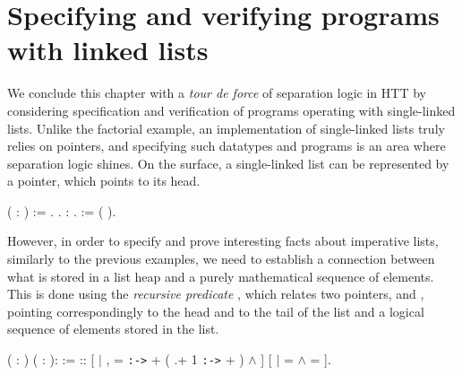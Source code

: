 \section{Specifying and verifying programs with linked lists}


We conclude this chapter with a \textit{tour de force} of separation logic in
HTT by considering specification and verification of programs
operating with single-linked lists. Unlike the factorial example, an
implementation of single-linked lists truly relies on pointers, and
specifying such datatypes and programs is an area where separation
logic shines.
On the surface, a single-linked list can be represented by a pointer,
which points to its head.
\begin{coqdoccode}
\coqdocemptyline
\coqdocnoindent
{}  ( : ) := .\coqdoceol
\coqdocemptyline
\coqdocnoindent
{} .\coqdoceol
\coqdocnoindent
{}  : .\coqdoceol
\coqdocnoindent
{}  := ( ).\coqdoceol
\coqdocemptyline
\end{coqdoccode}


However, in order to specify and prove interesting facts about
imperative lists, similarly to the previous examples, we need to
establish a connection between what is stored in a list heap and a
purely mathematical sequence of elements. This is done using the
\textit{recursive predicate} , which relates two pointers,  and ,
pointing correspondingly to the head and to the tail of the list and a
logical sequence  of elements stored in the list.
\begin{coqdoccode}
\coqdocemptyline
\coqdocnoindent
{}  (  : ) ( :  ):   := \coqdoceol
\coqdocindent{1.00em}
   ::  \coqdoceol
\coqdocindent{2.00em}
[  \ensuremath{|}   , \coqdoceol
\coqdocindent{3.50em}
 =  \texttt{:->}  + ( .+ 1 \texttt{:->}  + ) \ensuremath{\land}      ]\coqdoceol
\coqdocindent{1.00em}
 [  \ensuremath{|}  =  \ensuremath{\land}  = ].\coqdoceol
\coqdocemptyline
\end{coqdoccode}


